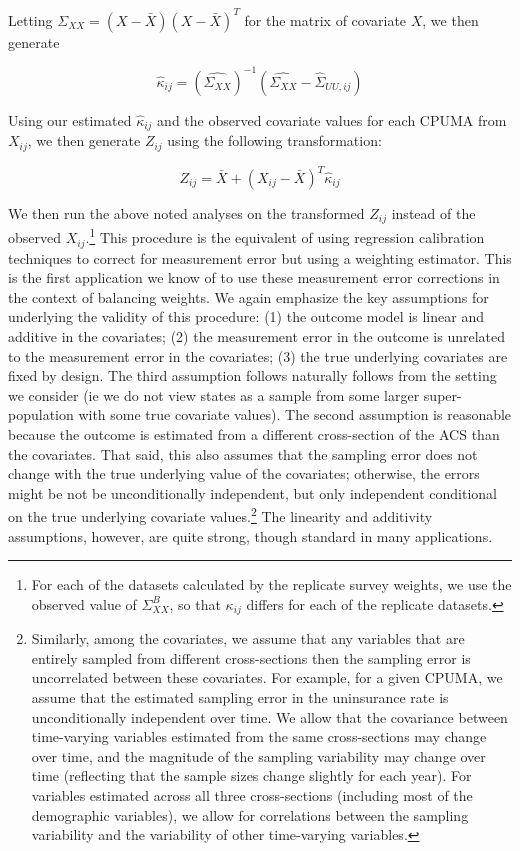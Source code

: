 \documentclass[12pt]{article}
\begin{document}
Letting $\Sigma_{XX} = (X - \bar{X})(X - \bar{X})^T$ for the matrix of covariate $X$, we then generate

$$
\hat{\kappa}_{ij} = (\hat{\Sigma_{XX}})^{-1}(\hat{\Sigma_{XX}} - \hat{\Sigma}_{UU, ij})
$$

Using our estimated $\hat{\kappa}_{ij}$ and the observed covariate values for each CPUMA from $X_{ij}$, we then generate $Z_{ij}$ using the following transformation:

$$
Z_{ij} = \bar{X} + (X_{ij} - \bar{X})^T\hat{\kappa}_{ij}
$$

We then run the above noted analyses on the transformed $Z_{ij}$ instead of the observed $X_{ij}$.\footnote{For each of the datasets calculated by the replicate survey weights, we use the observed value of $\Sigma_{XX}^B$, so that $\kappa_{ij}$ differs for each of the replicate datasets.} This procedure is the equivalent of using regression calibration techniques to correct for measurement error but using a weighting estimator. This is the first application we know of to use these measurement error corrections in the context of balancing weights. We again emphasize the key assumptions for underlying the validity of this procedure: (1) the outcome model is linear and additive in the covariates; (2) the measurement error in the outcome is unrelated to the measurement error in the covariates; (3) the true underlying covariates are fixed by design. The third assumption follows naturally follows from the setting we consider (ie we do not view states as a sample from some larger super-population with some true covariate values). The second assumption is reasonable because the outcome is estimated from a different cross-section of the ACS than the covariates. That said, this also assumes that the sampling error does not change with the true underlying value of the covariates; otherwise, the errors might be not be unconditionally independent, but only independent conditional on the true underlying covariate values.\footnote{Similarly, among the covariates, we assume that any variables that are entirely sampled from different cross-sections then the sampling error is uncorrelated between these covariates. For example, for a given CPUMA, we assume that the estimated sampling error in the uninsurance rate is unconditionally independent over time. We allow that the covariance between time-varying variables estimated from the same cross-sections may change over time, and the magnitude of the sampling variability may change over time (reflecting that the sample sizes change slightly for each year). For variables estimated across all three cross-sections (including most of the demographic variables), we allow for correlations between the sampling variability and the variability of other time-varying variables.} The linearity and additivity assumptions, however, are quite strong, though standard in many applications.
\end{document}

